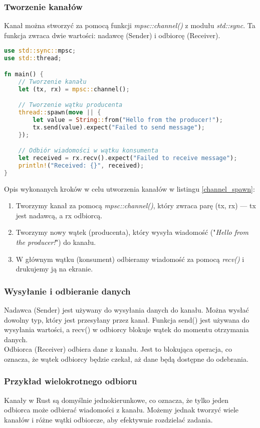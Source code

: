 \subsubsection{Tworzenie kanałów}
Kanał można stworzyć za pomocą funkcji \textit{mpsc::channel()} z modułu \textit{std::sync}. Ta funkcja zwraca dwie wartości: nadawcę (Sender) i odbiorcę (Receiver).

\begin{lstlisting}[language=Rust, caption=Przykład tworzenia kanału, label=channel_spawn]
use std::sync::mpsc;
use std::thread;

fn main() {
    // Tworzenie kanału
    let (tx, rx) = mpsc::channel();

    // Tworzenie wątku producenta
    thread::spawn(move || {
        let value = String::from("Hello from the producer!");
        tx.send(value).expect("Failed to send message");
    });

    // Odbiór wiadomości w wątku konsumenta
    let received = rx.recv().expect("Failed to receive message");
    println!("Received: {}", received);
}
\end{lstlisting}
Opis wykonanych kroków w celu utworzenia kanałów w listingu \ref{channel_spawn}:
\begin{enumerate}
    \item Tworzymy kanał za pomocą \textit{mpsc::channel()}, który zwraca parę (tx, rx) — tx jest nadawcą, a rx odbiorcą.
    \item Tworzymy nowy wątek (producenta), który wysyła wiadomość ("\textit{Hello from the producer!}") do kanału.
    \item W głównym wątku (konsument) odbieramy wiadomość za pomocą \textit{recv()} i drukujemy ją na ekranie.
\end{enumerate}

\subsubsection{Wysyłanie i odbieranie danych}
Nadawca (Sender) jest używany do wysyłania danych do kanału. Można wysłać dowolny typ, który jest przesyłany przez kanał. Funkcja send() jest używana do wysyłania wartości, a recv() w odbiorcy blokuje wątek do momentu otrzymania danych.\\
Odbiorca (Receiver) odbiera dane z kanału. Jest to blokująca operacja, co oznacza, że wątek odbiorcy będzie czekał, aż dane będą dostępne do odebrania.

\subsubsection{Przykład wielokrotnego odbioru}
Kanały w Rust są domyślnie jednokierunkowe, co oznacza, że tylko jeden odbiorca może odbierać wiadomości z kanału. Możemy jednak tworzyć wiele kanałów i różne wątki odbiorcze, aby efektywnie rozdzielać zadania.

